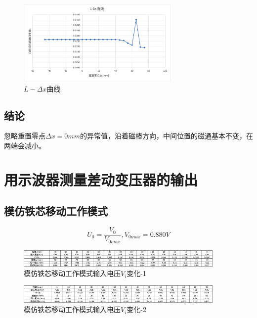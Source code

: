 \documentclass{article}
\begin{document}
\begin{figure}[htbp]
   \centering
   \includegraphics[width=0.7\textwidth]{RL-curve.png}
   \caption{$L-\Delta x$曲线}
 \end{figure}

\subsection{结论}
忽略重置零点$\Delta x = 0 mm$的异常值，沿着磁棒方向，中间位置的磁通基本不变，在两端会减小。

\newpage

\section{用示波器测量差动变压器的输出}

\subsection{模仿铁芯移动工作模式}
\begin{equation*}
   U_0 = \frac{V_0}{V_{0max}}, V_{0max} = 0.880 V
\end{equation*}

\begin{figure}[htbp]
   \centering
   \includegraphics[width=0.9\textwidth]{osc-1.png}
   \caption{模仿铁芯移动工作模式输入电压$V_i$变化-1}
 \end{figure}

\begin{figure}[htbp]
   \centering
   \includegraphics[width=0.9\textwidth]{osc-2.png}
   \caption{模仿铁芯移动工作模式输入电压$V_i$变化-2}
\end{figure}
\end{document}
